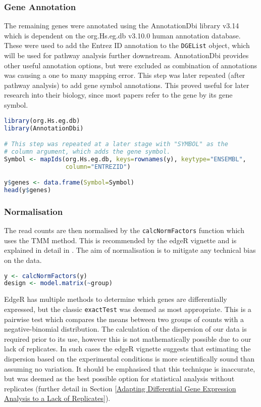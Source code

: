 \subsubsection{Gene Annotation}

The remaining genes were annotated using the AnnotationDbi library v3.14 \citep{annotationdbi} which is dependent on the org.Hs.eg.db v3.10.0 \citep{org.Hs.eg.db} human annotation database. These were used to add the Entrez ID annotation to the \texttt{DGEList} object, which will be used for pathway analysis further downstream. AnnotationDbi provides other useful annotation options, but were excluded as  combination of annotations was causing a one to many mapping error. This step was later repeated (after pathway analysis) to add gene symbol annotations. This proved useful for later research into their biology, since most papers refer to the gene by its gene symbol.

\begin{lstlisting}[language=R, caption=Annotation step]
library(org.Hs.eg.db)
library(AnnotationDbi) 

# This step was repeated at a later stage with "SYMBOL" as the
# column argument, which adds the gene symbol.
Symbol <- mapIds(org.Hs.eg.db, keys=rownames(y), keytype="ENSEMBL",
                 column="ENTREZID")

y$genes <- data.frame(Symbol=Symbol)
head(y$genes)
\end{lstlisting}

\subsubsection{Normalisation}

The read counts are then normalised by the \texttt{calcNormFactors} function which uses the \ac{TMM} method. This is recommended by the edgeR vignette and is explained in detail in \cite{robinson2010scaling}. The aim of normalisation is to mitigate any technical bias on the data.

\begin{lstlisting}[language=R, caption=TMM normalisation]
y <- calcNormFactors(y)
design <- model.matrix(~group)
\end{lstlisting}

EdgeR has multiple methods to determine which genes are differentially expressed, but the classic \texttt{exactTest} was deemed as most appropriate. This is a pairwise test which compares the means between two groups of counts with a negative-binomial distribution. The calculation of the dispersion of our data is required prior to its use, however this is not mathematically possible due to our lack of replicates. In such cases the edgeR vignette suggests that estimating the dispersion based on the experimental conditions is more scientifically sound than assuming no variation. It should be emphasised that this technique is inaccurate, but was deemed as the best possible option for statistical analysis without replicates (further detail in Section \ref{Adapting Differential Gene Expression Analysis to a Lack of Replicates}).

